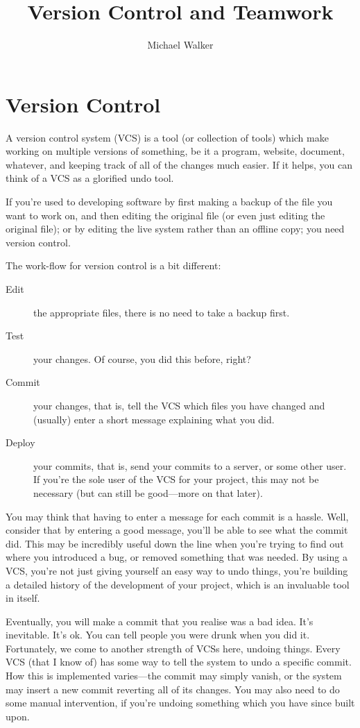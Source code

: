 \documentclass[12pt,a4paper]{article}
\author{Michael Walker}
\title{Version Control and Teamwork}
\begin{document}
\maketitle
\tableofcontents
\pagebreak

\section{Version Control}

A version control system (VCS) is a tool (or collection of tools)
which make working on multiple versions of something, be it a program,
website, document, whatever, and keeping track of all of the changes
much easier. If it helps, you can think of a VCS as a glorified undo
tool.

If you're used to developing software by first making a backup of the
file you want to work on, and then editing the original file (or even
just editing the original file); or by editing the live system rather
than an offline copy; you need version control.

The work-flow for version control is a bit different:

\begin{description}
  \item[Edit] the appropriate files, there is no need to take a backup
    first.
  \item[Test] your changes. Of course, you did this before, right?
  \item[Commit] your changes, that is, tell the VCS which files you
    have changed and (usually) enter a short message explaining what
    you did.
  \item[Deploy] your commits, that is, send your commits to a server,
    or some other user. If you're the sole user of the VCS for your
    project, this may not be necessary (but can still be good---more
    on that later).
\end{description}

You may think that having to enter a message for each commit is a
hassle. Well, consider that by entering a good message, you'll be able
to see what the commit did. This may be incredibly useful down the
line when you're trying to find out where you introduced a bug, or
removed something that was needed. By using a VCS, you're not just
giving yourself an easy way to undo things, you're building a
detailed history of the development of your project, which is an
invaluable tool in itself.

Eventually, you will make a commit that you realise was a bad
idea. It's inevitable. It's ok. You can tell people you were drunk
when you did it. Fortunately, we come to another strength of VCSs
here, undoing things. Every VCS (that I know of) has some way to tell
the system to undo a specific commit. How this is implemented
varies---the commit may simply vanish, or the system may insert a new
commit reverting all of its changes. You may also need to do some
manual intervention, if you're undoing something which you have since
built upon.
\end{document}
